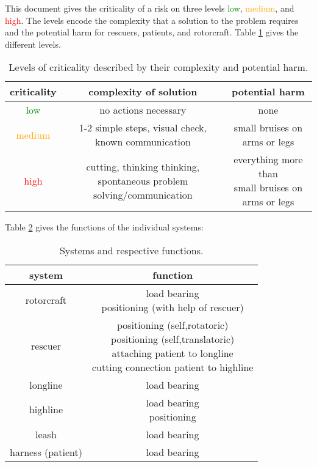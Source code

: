 \documentclass[a4paper,10pt]{scrartcl}
\begin{document}
This document gives the criticality of a risk on three levels \textcolor{green}{low}, \textcolor{orange}{medium}, and \textcolor{red}{high}. The levels encode the complexity that a solution to the problem requires and the potential harm for rescuers, patients, and rotorcraft. Table \ref{tab:crit} gives the different levels.

\begin{table}[!ht]
\centering
\begin{tabular}{ c | c | c }
 criticality & complexity of solution & potential harm \\ 
 \hline
 \hline 
 \textcolor{green}{low} & no actions necessary & none \\ 
 \hline
 \textcolor{orange}{medium} & 1-2 simple steps, visual check, known communication & small bruises on arms or legs \\ 
 \hline
 \textcolor{red}{high} & \makecell{cutting, thinking thinking, \\ spontaneous problem solving/communication} & \makecell{everything more than \\ small bruises on arms or legs} \\  
   
\end{tabular}
\caption{Levels of criticality described by their complexity and potential harm.}
\label{tab:crit}
\end{table}

Table \ref{tab:func} gives the functions of the individual systems:
\begin{table}[!ht]
\centering
\begin{tabular}{ c | c  }
 system & function \\ 
 \hline
 \hline 
 rotorcraft & \makecell{load bearing \\ positioning (with help of rescuer)} \\
 \hline 
 rescuer & \makecell{positioning (self,rotatoric) \\ positioning (self,translatoric) \\ attaching patient to longline \\ cutting connection patient to highline} \\
 \hline
 longline & load bearing \\
 \hline
 highline & \makecell{load bearing \\ positioning} \\
 \hline
 leash & load bearing \\
 \hline
 harness (patient) & load bearing \\ 
\end{tabular}
\caption{Systems and respective functions.}
\label{tab:func}
\end{table}
\end{document}
